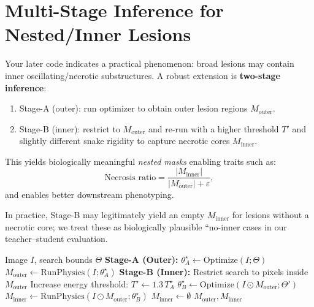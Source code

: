 \documentclass[journal]{IEEEtran}
\begin{document}
\section{Multi-Stage Inference for Nested/Inner Lesions}
\label{sec:multistage}
Your later code indicates a practical phenomenon: broad lesions may contain inner oscillating/necrotic substructures.
A robust extension is \textbf{two-stage inference}:
\begin{enumerate}
    \item Stage-A (outer): run optimizer to obtain outer lesion regions $M_{\text{outer}}$.
    \item Stage-B (inner): restrict to $M_{\text{outer}}$ and re-run with a higher threshold $T'$ and slightly different snake rigidity to capture necrotic cores $M_{\text{inner}}$.
\end{enumerate}
This yields biologically meaningful \emph{nested masks} enabling traits such as:
\begin{equation}
\text{Necrosis ratio} = \frac{|M_{\text{inner}}|}{|M_{\text{outer}}|+\varepsilon},
\end{equation}
and enables better downstream phenotyping.

In practice, Stage-B may legitimately yield an empty $M_{\text{inner}}$ for lesions without a necrotic core; we treat these as biologically plausible ``no-inner cases in our teacher--student evaluation.

\begin{algorithm}
\caption{Two-Stage Nested Lesion Inference}
\label{alg:two_stage}
\begin{algorithmic}[1]
\REQUIRE Image $I$, search bounds $\Theta$
\STATE \textbf{Stage-A (Outer):} $\theta_A^\star \leftarrow \mathrm{Optimize}(I;\Theta)$
\STATE $M_{\text{outer}} \leftarrow \mathrm{RunPhysics}(I;\theta_A^\star)$ 
    \STATE \textbf{Stage-B (Inner):} Restrict search to pixels inside $M_{\text{outer}}$
    \STATE Increase energy threshold: $T' \leftarrow 1.3\,T_A^\star$
    \STATE $\theta_B^\star \leftarrow \mathrm{Optimize}(I \odot M_{\text{outer}};\Theta')$
    \STATE $M_{\text{inner}} \leftarrow \mathrm{RunPhysics}(I \odot M_{\text{outer}};\theta_B^\star)$ 
\ELSE
    \STATE $M_{\text{inner}} \leftarrow \emptyset$
\ENDIF
\RETURN $M_{\text{outer}}, M_{\text{inner}}$
\end{algorithmic}
\end{algorithm}
\end{document}
